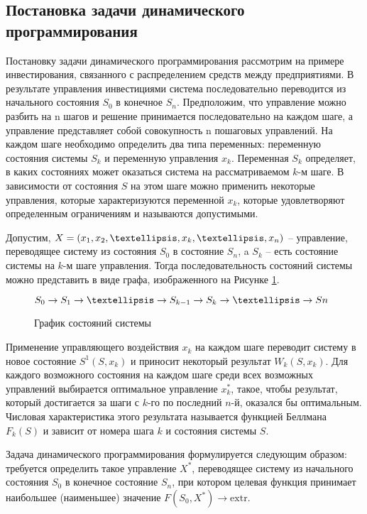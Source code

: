 \subsection{Постановка задачи динамического программирования}

Постановку задачи динамического программирования рассмотрим на примере инвестирования, связанного с распределением средств между предприятиями. В результате управления инвестициями система последовательно переводится из начального состояния $S_0$ в конечное $S_n$. Предположим, что управление можно разбить на n шагов и решение принимается последовательно на каждом шаге, а управление представляет собой совокупность n пошаговых управлений. На каждом шаге необходимо определить два типа переменных: переменную состояния системы $S_k$ и переменную управления $x_k$. Переменная $S_k$ определяет, в каких состояниях может оказаться система на рассматриваемом $k$-м шаге. В зависимости от состояния $S$ на этом шаге можно применить некоторые управления, которые характеризуются переменной $x_k$, которые удовлетворяют определенным ограничениям и называются допустимыми.

Допустим, $X = (x_1, x_2, \textellipsis, x_k, \textellipsis, x_n)$ – управление, переводящее систему из состояния $S_0$ в состояние $S_n$, a $S_k$ – есть состояние системы на $k$-м шаге управления. Тогда последовательность состояний системы можно представить в виде графа, изображенного на Рисунке \ref{sec:task:definition:system-state}.

\begin{figure}[h]
  \centering
    $S_0 \rightarrow S_1 \rightarrow \textellipsis \rightarrow S_{k-1} \rightarrow S_k \rightarrow \textellipsis \rightarrow Sn$
  \caption{График состояний системы}
  \label{sec:task:definition:system-state}
\end{figure}

Применение управляющего воздействия $x_k$ на каждом шаге переводит систему в новое состояние $S^1(S, x_k)$ и приносит некоторый результат $W_k (S, x_k)$. Для каждого возможного состояния на каждом шаге среди всех возможных управлений выбирается оптимальное управление $x^*_k$, такое, чтобы результат, который достигается за шаги с $k$-го по последний $n$-й, оказался бы оптимальным. Числовая характеристика этого результата называется функцией Беллмана $F_k(S)$ и зависит от номера шага $k$ и состояния системы $S$.

Задача динамического программирования формулируется следующим образом: требуется определить такое управление $X^*$, переводящее систему из начального состояния $S_0$ в конечное состояние $S_n$, при котором целевая функция принимает наибольшее (наименьшее) значение $F(S_0, X^*) \rightarrow \text{extr}$.

